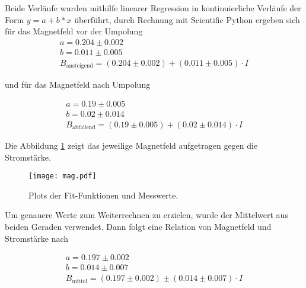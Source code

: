 \noindent Beide Verläufe wurden mithilfe linearer Regression in kontinuierliche Verläufe der Form $y = a + b*x$ überführt, durch Rechnung mit Scientific Python ergeben sich für das 
Magnetfeld vor der Umpolung
\begin{align*}
a = 0.204 \pm 0.002\\
b = 0.011 \pm 0.005\\
B_{\text{ansteigend}} = (0.204 \pm 0.002) + (0.011 \pm 0.005) \cdot I
\end{align*}

und für das Magnetfeld nach Umpolung

\begin{align*}
a = 0.19 \pm 0.005\\
b = 0.02 \pm 0.014\\
B_{\text{abfallend}} = (0.19 \pm 0.005) + (0.02 \pm 0.014) \cdot I
\end{align*}

\noindent Die Abbildung \ref{fig:plots} zeigt das jeweilige Magnetfeld aufgetragen gegen die Stromstärke. 

\begin{figure}
 \centering
 \texttt{[image: mag.pdf]}
 \caption{Plots der Fit-Funktionen und Messwerte.}
 \label{fig:plots}
\end{figure} 
\FloatBarrier
\noindent Um genauere Werte zum Weiterrechnen zu erzielen, wurde der Mittelwert aus
beiden Geraden verwendet. Dann folgt eine Relation von Magnetfeld und Stromstärke nach

\begin{align*}
a = 0.197 \pm 0.002\\
b = 0.014 \pm 0.007\\
B_{\text{mittel}} = (0.197 \pm 0.002) \pm (0.014 \pm 0.007) \cdot I
\end{align*}



